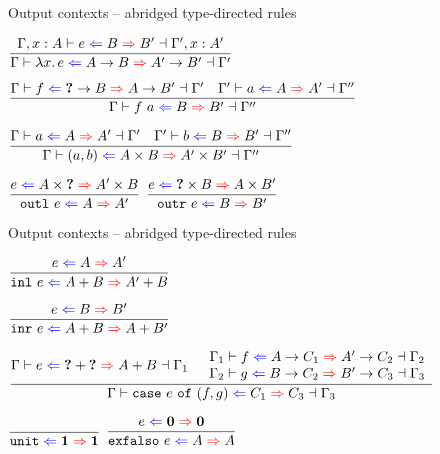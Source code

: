 \documentclass{beamer}
\begin{document}
\begin{frame}{Output contexts -- abridged type-directed rules}

\begin{center}
  $\infrule{\fulloutctx{\extend{\Gamma}{x}{A}}{e}{B}{B'}{\extend{\Gamma'}{x}{A'}}}{\outctx{\fun{x}{e}}{\Fun{A}{B}}{\Fun{A'}{B'}}}$

  \vspace{1em}

  $\infrule{\fulloutctx{\Gamma}{f}{\Fun{\Hole}{B}}{\Fun{A}{B'}}{\Gamma'} \quad \fulloutctx{\Gamma'}{a}{A}{A'}{\Gamma''}}{\fulloutctx{\Gamma}{\app{f}{a}}{B}{B'}{\Gamma''}}$

  \vspace{1em}

  $\infrule{\fulloutctx{\Gamma}{a}{A}{A'}{\Gamma'} \quad \fulloutctx{\Gamma'}{b}{B}{B'}{\Gamma''}}{\fulloutctx{\Gamma}{\pair{a}{b}}{\Prod{A}{B}}{\Prod{A'}{B'}}{\Gamma''}}$

  \vspace{1em}

  $\infrule{\shortoutctx{e}{\Prod{A}{\Hole}}{\Prod{A'}{B}}}{\shortoutctx{\outl{e}}{A}{A'}}$
  \quad
  $\infrule{\shortoutctx{e}{\Prod{\Hole}{B}}{\Prod{A}{B'}}}{\shortoutctx{\outr{e}}{B}{B'}}$
\end{center}

\end{frame}

\begin{frame}{Output contexts -- abridged type-directed rules}

\begin{center}
  $\infrule{\shortoutctx{e}{A}{A'}}{\shortoutctx{\inl{e}}{\Sum{A}{B}}{\Sum{A'}{B}}}$

  \vspace{2em}

  $\infrule{\shortoutctx{e}{B}{B'}}{\shortoutctx{\inr{e}}{\Sum{A}{B}}{\Sum{A}{B'}}}$

  \vspace{2em}

  $\infrule{\fulloutctx{\Gamma}{e}{\Sum{\Hole}{\Hole}}{\Sum{A}{B}}{\Gamma_1} \quad \begin{array}{c} \fulloutctx{\Gamma_1}{f}{\Fun{A}{C_1}}{\Fun{A'}{C_2}}{\Gamma_2} \\ \fulloutctx{\Gamma_2}{g}{\Fun{B}{C_2}}{\Fun{B'}{C_3}}{\Gamma_3} \end{array}}{\fulloutctx{\Gamma}{\case{e}{f}{g}}{C_1}{C_3}{\Gamma_3}}$

  \vspace{2em}

  $\infrule{}{\shortoutctx{\unit}{\Unit}{\Unit}}$
  \quad
  $\infrule{\shortoutctx{e}{\Empty}{\Empty}}{\shortoutctx{\exfalso{e}}{A}{A}}$
\end{center}

\end{frame}
\end{document}
